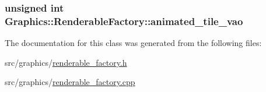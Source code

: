\subsubsection[{animated\+\_\+tile\+\_\+vao}]{\setlength{\rightskip}{0pt plus 5cm}unsigned int Graphics\+::\+Renderable\+Factory\+::animated\+\_\+tile\+\_\+vao\hspace{0.3cm}{\ttfamily [private]}}\label{class_graphics_1_1_renderable_factory_ada5e3359529345b7c9d0498f54eab5a4}


The documentation for this class was generated from the following files\+:\begin{DoxyCompactItemize}
\item 
src/graphics/\hyperlink{renderable__factory_8h}{renderable\+\_\+factory.\+h}\item 
src/graphics/\hyperlink{renderable__factory_8cpp}{renderable\+\_\+factory.\+cpp}\end{DoxyCompactItemize}
